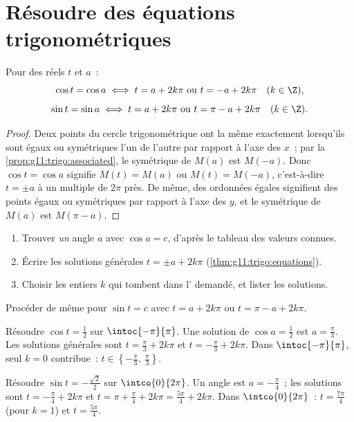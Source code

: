 \section{Résoudre des équations trigonométriques}

\begin{theorem}[Les équations $\cos t = \cos a$ et $\sin t = \sin a$]
\label{thm:g11:trigo:equations}
Pour des réels $t$ et $a$~:
\[
\cos t = \cos a \iff t = a + 2k\pi \ \text{ou}\ t = -a + 2k\pi
\quad (k \in \Z),
\]
\[
\sin t = \sin a \iff t = a + 2k\pi \ \text{ou}\ t = \pi - a + 2k\pi
\quad (k \in \Z).
\]
\end{theorem}

\begin{proof}
Deux points du cercle trigonométrique ont la même  exactement
lorsqu'ils sont égaux ou symétriques l'un de l'autre par rapport à l'axe
des $x$~; par la \cref{prop:g11:trigo:associated}, le symétrique de
$M(a)$ est $M(-a)$. Donc $\cos t = \cos a$ signifie $M(t) = M(a)$ ou
$M(t) = M(-a)$, c'est-à-dire $t = \pm a$ à un multiple de $2\pi$ près.
De même, des ordonnées égales signifient des points égaux ou symétriques
par rapport à l'axe des $y$, et le symétrique de $M(a)$ est
$M(\pi - a)$.
\end{proof}

\begin{method}[Résoudre $\cos t = c$ sur un intervalle]\label{met:g11:trigo:solve}
\begin{enumerate}
  \item Trouver \emph{un} angle $a$ avec $\cos a = c$, d'après le tableau
        des valeurs connues.
  \item Écrire les solutions générales $t = \pm a + 2k\pi$
        (\cref{thm:g11:trigo:equations}).
  \item Choisir les entiers $k$ qui tombent dans l' demandé, et
        lister les solutions.
\end{enumerate}
Procéder de même pour $\sin t = c$ avec $t = a + 2k\pi$ ou
$t = \pi - a + 2k\pi$.
\end{method}

\begin{example}\label{ex:g11:trigo:solve}
Résoudre $\cos t = \frac12$ sur $\intoc{-\pi}{\pi}$. Une solution de
$\cos a = \frac12$ est $a = \frac{\pi}{3}$. Les solutions générales sont
$t = \frac\pi3 + 2k\pi$ et $t = -\frac\pi3 + 2k\pi$. Dans
$\intoc{-\pi}{\pi}$, seul $k = 0$ contribue~:
$t \in \left\{-\frac\pi3,\ \frac\pi3\right\}$.

Résoudre $\sin t = -\frac{\sqrt2}{2}$ sur $\intco{0}{2\pi}$. Un angle est
$a = -\frac\pi4$~; les solutions sont $t = -\frac\pi4 + 2k\pi$ et
$t = \pi + \frac\pi4 + 2k\pi = \frac{5\pi}{4} + 2k\pi$. Dans
$\intco{0}{2\pi}$~: $t = \frac{7\pi}{4}$ (pour $k = 1$) et
$t = \frac{5\pi}{4}$.
\end{example}

